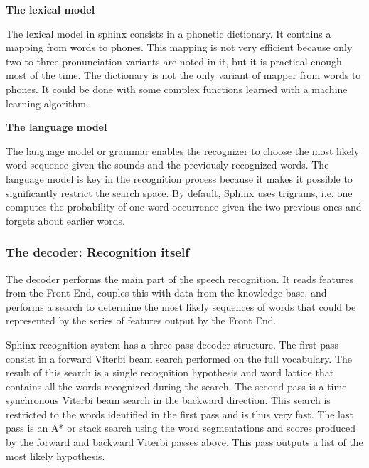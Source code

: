 \textbf{The lexical model}

The lexical model in sphinx consists in a phonetic dictionary. It contains a mapping from words to phones. This mapping is not very efficient because only two to three pronunciation variants are noted in it, but it is practical enough most of the time. The dictionary is not the only variant of mapper from words to phones. It could be done with some complex functions learned with a machine learning algorithm. 

\textbf{The language model}
 
The language model or grammar enables the recognizer to choose the most likely word sequence given the sounds and the previously recognized words. The language model is key in the recognition process because it makes it possible to significantly restrict the search space. By default, Sphinx uses trigrams, i.e. one computes the probability of one word occurrence given the two previous ones and forgets about earlier words.  

\subsubsection*{The decoder: Recognition itself}
The decoder performs the main part of the speech recognition. It reads features from the Front End, couples this with data from the knowledge base, and performs a search to determine the most likely sequences of words that could be represented by the series of features output by the Front End.

Sphinx recognition system has a three-pass decoder structure. The first pass consist in a forward Viterbi beam search performed on the full vocabulary. The result of this search is a single recognition hypothesis and word lattice that contains all the words recognized during the search. The second pass is a time synchronous Viterbi beam search in the backward direction. This search is restricted to the words identified in the first pass and is thus very fast. The last pass is an A* or stack search using the word segmentations and scores produced by the forward and backward Viterbi passes above. This pass outputs a list of the most likely hypothesis.
